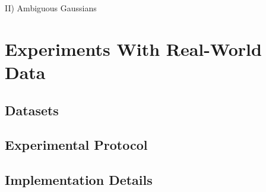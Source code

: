 II) Ambiguous Gaussians %

\section{Experiments With Real-World Data}
\subsection{Datasets}
\subsection{Experimental Protocol}
\subsection{Implementation Details}
